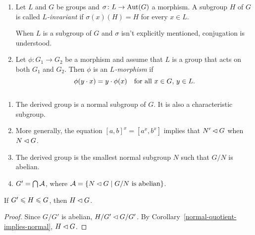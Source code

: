 \begin{defns}${}$
    \begin{enumerate}[\rm-]
        \item Let\/ $L$ and $G$ be groups and\/ $\sigma\colon L\to{\rm Aut}(G)$ a morphism. A subgroup\/ $H$ of\/ $G$ is called \textsl{$L$-invariant} if\/ $\sigma(x)(H)=H$ for every\/ $x\in L$.
        
        When\/ $L$ is a subgroup of\/ $G$ and\/ $\sigma$ isn't explicitly mentioned, conjugation is understood.

        \item Let\/ $\phi\colon G_1\to G_2$ be a morphism and assume that\/ $L$ is a group that acts on both\/ $G_1$ and\/ $G_2$. Then\/ $\phi$ is an\/ \textsl{$L$-morphism} if
        $$
            \phi(y\cdot x) = y\cdot \phi(x)\quad\text{\rm for all }x\in G,\, y\in L.
        $$
    \end{enumerate}
\end{defns}

\begin{rems}\label{derived-group}${}$
    \begin{enumerate}[\rm i)]
        \item The derived group is a normal subgroup of\/ $G$. It is also a characteristic subgroup.

        \item More generally, the equation $[a,b]^x=[a^x,b^x]$ implies that $N'\lhd G$ when $N\lhd G$.

        \item The derived group is the smallest normal subgroup\/ $N$ such that\/ $G/N$ is abelian.

        \item $G'=\bigcap\cal A$, where ${\cal A}=\{N\lhd G\mid G/N \text{ \rm is abelian}\}$.
    \end{enumerate}
\end{rems}

\begin{prop}
    If\/ $G'\leqslant H\leqslant G$, then\/ $H\lhd G$.
\end{prop}

\begin{proof} Since $G/G'$ is abelian, $H/G'\lhd G/G'$. By Corollary~\ref{normal-quotient-implies-normal}, $H\lhd G$.

\end{proof}


